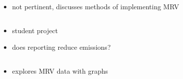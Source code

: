 \documentclass{article}
\newcommand{\paperpath}{../resources/}
\newcommand{\myhref}[2]{\href{run:\paperpath#1}{#2}}
\begin{document}
\subsection{\myhref{Castells-Sanabra et al 2020 - Existing Emission Calculation Methods Applied to Monitoring, Reporting and Verification (MRV) on Board.pdf}{\textcite{castells2020existing}}}
\begin{itemize}
    \item not pertinent, discusses methods of implementing MRV
\end{itemize}
\subsection{\myhref{lundkvist 2023 - Can targeted disclosure regulations facilitate the environmental transition of the shipping sector    a study on the effect of the EU MRV Regulation on ship emissions.pdf}{\textcite{lundkvist2023can}}}
\begin{itemize}
    \item student project
    \item does reporting reduce emissions?
\end{itemize}
\subsection{\myhref{Luo 2023 - After five years application of the European Union MRV mechanism Review and prospectives.pdf}{\textcite{luo2023after}}}
\begin{itemize}
    \item explores MRV data with graphs
\end{itemize}



\newpage
\printbibliography
\end{document}
